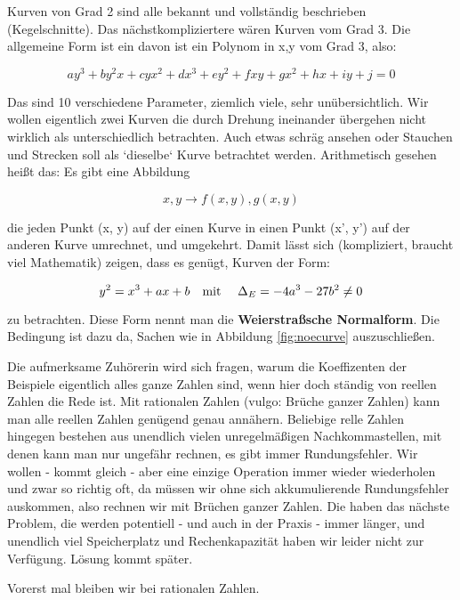 \documentclass{article}
\newcounter{thm}
\begin{document}
Kurven von Grad 2 sind alle bekannt und vollständig beschrieben
(Kegelschnitte). Das nächstkompliziertere wären Kurven vom Grad 3.
Die allgemeine Form ist ein davon ist ein Polynom in x,y vom Grad 3,
also:

\begin{equation*}
  a y^3 + b y^2 x + c y x^2 + d x^3 + e y^2 + f x y + g x^2
  + h x + i y + j = 0
\end{equation*}

Das sind 10 verschiedene Parameter, ziemlich viele, sehr
unübersichtlich. Wir wollen eigentlich zwei Kurven die durch Drehung
ineinander übergehen nicht wirklich als unterschiedlich betrachten. Auch etwas
schräg ansehen oder Stauchen und Strecken soll als `dieselbe` Kurve betrachtet
werden. Arithmetisch gesehen heißt das: Es gibt eine Abbildung

\begin{equation*}
  x, y \rightarrow f(x, y), g(x, y)
\end{equation*}

die jeden Punkt (x, y) auf der einen Kurve in einen Punkt (x', y') auf der
anderen Kurve umrechnet, und umgekehrt. Damit lässt sich (kompliziert, braucht
viel Mathematik) zeigen, dass es genügt, Kurven der Form:

$$ y^2 = x^3 + ax + b \text{\quad mit \quad } \Delta_E = -4a^3 - 27b^2 \ne 0 $$

zu betrachten. Diese Form nennt man die \textbf{Weierstraßsche Normalform}.
Die Bedingung ist dazu da, Sachen wie in Abbildung \ref{fig:noecurve}
auszuschließen.

Die aufmerksame Zuhörerin wird sich fragen, warum die Koeffizenten der
Beispiele eigentlich alles ganze Zahlen sind, wenn hier doch ständig von
reellen Zahlen die Rede ist. Mit rationalen Zahlen (vulgo: Brüche ganzer
Zahlen) kann man alle reellen Zahlen genügend genau annähern.
Beliebige relle Zahlen hingegen bestehen aus unendlich vielen unregelmäßigen
Nachkommastellen, mit denen kann man nur ungefähr rechnen, es gibt immer
Rundungsfehler. Wir wollen - kommt gleich - aber eine einzige Operation immer
wieder wiederholen und zwar so richtig oft, da müssen wir ohne sich
akkumulierende Rundungsfehler auskommen, also rechnen wir mit Brüchen ganzer
Zahlen. Die haben das nächste Problem, die werden potentiell - und auch in der
Praxis - immer länger, und unendlich viel Speicherplatz und Rechenkapazität
haben wir leider nicht zur Verfügung. Lösung kommt später.

Vorerst mal bleiben wir bei rationalen Zahlen.
\end{document}
